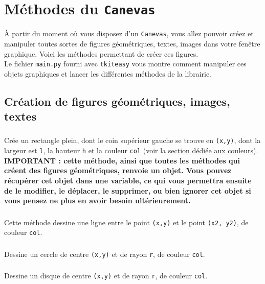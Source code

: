 \documentclass[11pt,a4paper]{article}
\begin{document}
\section{Méthodes du {\tt Canevas}}
\`A partir du moment où vous disposez d'un {\tt Canevas}, vous allez pouvoir créez et manipuler toutes sortes de figures géométriques, textes, images dans votre fenêtre graphique. Voici les méthodes permettant de créer ces figures.\\
Le fichier {\tt main.py} fourni avec {\tt tkiteasy} vous montre comment manipuler ces objets graphiques et lancer les différentes méthodes de la librairie.

\subsection*{Création de figures géométriques, images, textes}

\subsubsection*{}
Crée un rectangle plein, dont le coin supérieur gauche se trouve en {\tt (x,y)}, dont la largeur est {\tt l}, la hauteur {\tt h} et la couleur {\tt col} (voir la \underline{section dédiée aux couleurs}).\\

{\bf IMPORTANT : cette méthode, ainsi que toutes les méthodes qui créent des figures géométriques, renvoie un objet. Vous pouvez récupérer cet objet dans une variable, ce qui vous permettra ensuite de le modifier, le déplacer, le supprimer, ou bien ignorer cet objet si vous pensez ne plus en avoir besoin ultérieurement.}

\subsubsection*{}
Cette méthode dessine une ligne entre le point {\tt (x,y)} et le point {\tt (x2, y2)}, de couleur {\tt col}.

\subsubsection*{}
Dessine un cercle de centre {\tt (x,y)} et de rayon {\tt r}, de couleur {\tt col}.

\subsubsection*{}
Dessine un disque de centre {\tt (x,y)} et de rayon {\tt r}, de couleur {\tt col}.
\end{document}
